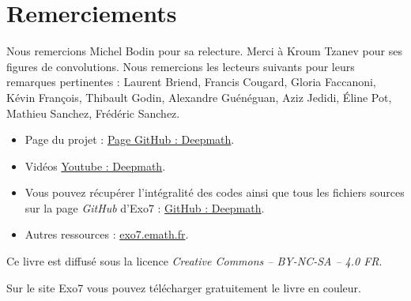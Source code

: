 
\clearemptydoublepage
\pagestyle{empty}\thispagestyle{empty}

\vspace*{\fill}

\section*{Remerciements}


Nous remercions Michel Bodin pour sa relecture.
Merci à Kroum Tzanev pour ses figures de convolutions.
Nous remercions les lecteurs suivants pour leurs remarques pertinentes :
	Laurent Briend, 
	Francis Cougard,
	Gloria Faccanoni,
	Kévin François, 
	Thibault Godin,
	Alexandre Guénéguan,
	Aziz Jedidi,
	Éline Pot,
	Mathieu Sanchez,
	Frédéric Sanchez.

\bigskip

\begin{itemize}

  \item Page du projet : \href{https://exo7math.github.io/deepmath-exo7/}{\og{}Page GitHub : Deepmath\fg{}}.

  \item Vidéos \href{https://www.youtube.com/channel/UCnKarYaG1VuzdWix1vBitFg/}{\og{}Youtube : Deepmath\fg{}}.

  \item Vous pouvez récupérer l'intégralité des codes \Python{} ainsi que tous les fichiers sources sur la page \emph{GitHub} d'Exo7 :
\href{https://github.com/exo7math/deepmath-exo7}{\og{}GitHub : Deepmath\fg{}}.
  
  \item Autres ressources : \href{http://exo7.emath.fr/}{exo7.emath.fr}.
\end{itemize}




\vspace*{\fill}

\bigskip 

\begin{center}
\end{center}



\begin{center}
Ce livre est diffusé sous la licence \emph{Creative Commons -- BY-NC-SA -- 4.0 FR}.

Sur le site Exo7 vous pouvez télécharger gratuitement le livre en couleur.
\end{center}




\printindex
{}

